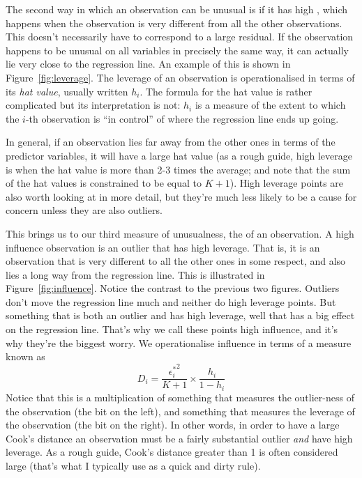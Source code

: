 The second way in which an observation can be unusual is if it has high , which happens when the observation is very different from all the other observations. This doesn't necessarily have to correspond to a large residual. If the observation happens to be unusual on all variables in precisely the same way, it can actually lie very close to the regression line. An example of this is shown in Figure~\ref{fig:leverage}. The leverage of an observation is operationalised in terms of its {\it hat value}, usually written $h_i$. The formula for the hat value is rather complicated but its interpretation is not: $h_i$ is a measure of the extent to which the $i$-th observation is ``in control'' of where the regression line ends up going. 

In general, if an observation lies far away from the other ones in terms of the predictor variables, it will have a large hat value (as a rough guide, high leverage is when the hat value is more than 2-3 times the average; and note that the sum of the hat values is constrained to be equal to $K+1$). High leverage points are also worth looking at in more detail, but they're much less likely to be a cause for concern unless they are also outliers.  %

This brings us to our third measure of unusualness, the  of an observation. A high influence observation is an outlier that has high leverage. That is, it is an observation that is very different to all the other ones in some respect, and also lies a long way from the regression line. This is illustrated in Figure~\ref{fig:influence}. Notice the contrast to the previous two figures. Outliers don't move the regression line much and neither do high leverage points. But something that is both an outlier and has high leverage, well that has a big effect on the regression line. That's why we call these points high influence, and it's why they're the biggest worry. We operationalise influence in terms of a measure known as 
$$
D_i = \frac{{\epsilon_i^*}^2 }{K+1} \times \frac{h_i}{1-h_i}
$$ 
Notice that this is a multiplication of something that measures the outlier-ness of the observation (the bit on the left), and something that measures the leverage of the observation (the bit on the right). In other words, in order to have a large Cook's distance an observation must be a fairly substantial outlier {\it and} have high leverage. As a rough guide, Cook's distance greater than 1 is often considered large (that's what I typically use as a quick and dirty rule). 

